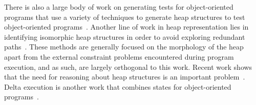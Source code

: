 There is also a large body of work on generating tests for
object-oriented programs that use a variety of techniques to generate
heap structures to test object-oriented
programs~\cite{xie2005symstra,xie2004rostra,boyapati2002korat,artzi2006finding}.
Another line of work in heap representation lies in identifying
isomorphic heap structures in order to avoid exploring redundant
paths~\cite{milicevic2007korat}.  These methods are generally focused
on the morphology of the heap apart from the external constraint
problems encountered during program execution, and as such, are
largely orthogonal to this work. Recent work shows that the need for
reasoning about heap structures is an important
problem~\cite{barr2013collecting}. Delta execution is another work
that combines states for object-oriented programs~\cite{d2008delta}.


